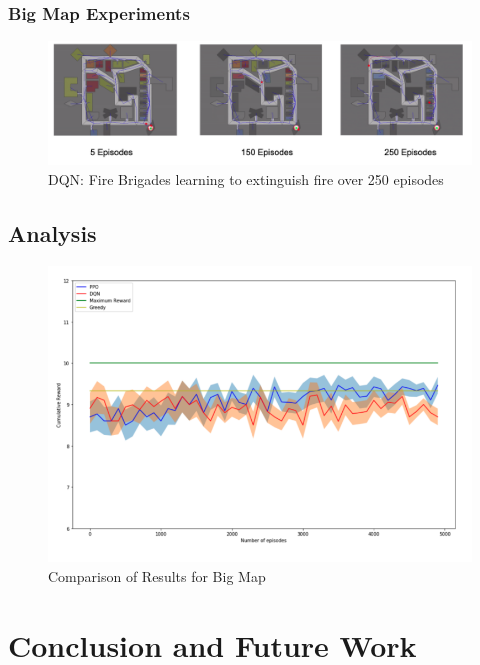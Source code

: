 \documentclass[12pt]{report}
\begin{document}
\subsection{Big Map Experiments}


\begin{figure}[!h]
    \centering
    \includegraphics[width=17cm]{DQN.png}
    \caption{DQN: Fire Brigades learning to extinguish fire over 250 episodes}
    \label{fig:DQNLearningSmallMap}
\end{figure}

\section{Analysis} \label{Analysis}

\begin{figure}[!h]
    \centering
    \includegraphics[width=12cm]{30.png}
    \caption{Comparison of Results for Big Map}
    \label{fig:DQNSmallMapLearningMaps}
\end{figure}

\chapter{Conclusion and Future Work}




      
\end{document}
